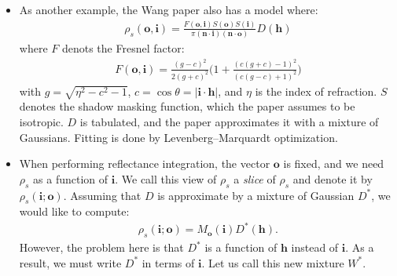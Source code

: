 \documentclass[10pt]{article}
\newcommand{\ve}[1]{\mathbf{#1}}
\begin{document}
\begin{itemize}
    \item As another example, the Wang paper also has a model where:
    \begin{align*}
      \rho_s(\ve{o},\ve{i}) = \frac{F(\ve{o},\ve{i}) S(\ve{o}) S(\ve{i})}{\pi (\ve{n} \cdot \ve{i}) (\ve{n} \cdot \ve{o})} D(\ve{h})
    \end{align*}
    where $F$ denots the Fresnel factor:
    \begin{align*}
      F(\ve{o},\ve{i}) = \frac{(g-c)^2}{2(g+c)^2} \bigg( 1 + \frac{(c(g+c)-1)^2}{(c(g-c)+1)^2} \bigg)
    \end{align*}
    with $g = \sqrt{\eta^2 - c^2 -1}$, $c = \cos\theta = |\ve{i} \cdot \ve{h}|$, and $\eta$ is the index of refraction.  $S$ denotes the shadow masking function, which the paper assumes to be isotropic.  $D$ is tabulated, and the paper approximates it with a mixture of Gaussians.  Fitting is done by Levenberg--Marquardt optimization.

    \item When performing reflectance integration, the vector $\ve{o}$ is fixed, and we need $\rho_s$ as a function of $\ve{i}$.  We call this view of $\rho_s$ a \emph{slice} of $\rho_s$ and denote it by $\rho_s(\ve{i}; \ve{o})$.  Assuming that $D$ is approximate by a mixture of Gaussian $D^*$, we would like to compute:
    \begin{align*}
      \rho_s(\ve{i}; \ve{o}) = M_{\ve{o}}(\ve{i}) D^*(\ve{h}).
    \end{align*}
    However, the problem here is that $D^*$ is a function of $\ve{h}$ instead of $\ve{i}$.  As a result, we must write $D^*$ in terms of $\ve{i}$.  Let us call this new mixture $W^*$.


\end{itemize}
\end{document}
